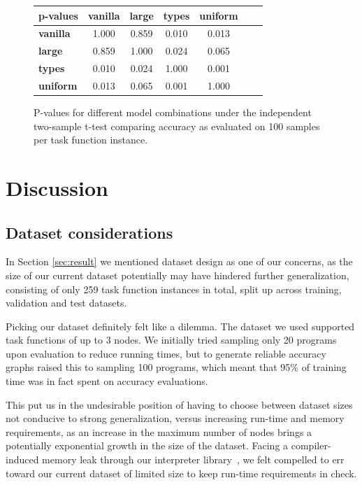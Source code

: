 \documentclass{article}
\begin{document}
\begin{figure}
    \begin{tabular}{|l|c|c|c|c|c|c|} \hline
        \textbf{p-values}
        & \textbf{vanilla} & \textbf{large} & \textbf{types} & \textbf{uniform} \\ \hline
        \textbf{vanilla} & 1.000 & 0.859 & 0.010 & 0.013 \\ \hline
        \textbf{large} & 0.859 & 1.000 & 0.024 & 0.065 \\ \hline
        \textbf{types} & 0.010 & 0.024 & 1.000 & 0.001 \\ \hline
        \textbf{uniform} & 0.013 & 0.065 & 0.001 & 1.000 \\ \hline
    \end{tabular}
    \caption{P-values for different model combinations under the independent two-sample t-test comparing accuracy as evaluated on 100 samples per task function instance.}
    \label{fig:ttest}
\end{figure}

\pagebreak

\section{Discussion} %

\subsection{Dataset considerations}

In Section \ref{sec:result} we mentioned dataset design as one of our concerns,
as the size of our current dataset potentially may have hindered further generalization,
consisting of only 259 task function instances in total,
split up across training, validation and test datasets.

Picking our dataset definitely felt like a dilemma.
The dataset we used supported task functions of up to 3 nodes.
We initially tried sampling only 20 programs upon evaluation to reduce running times,
but to generate reliable accuracy graphs raised this to sampling 100 programs,
which meant that 95\% of training time was in fact spent on accuracy evaluations.

This put us in the undesirable position of having to choose
between dataset sizes not conducive to strong generalization,
versus increasing run-time and memory requirements,
as an increase in the maximum number of nodes brings a potentially exponential growth in the size of the dataset.
Facing a compiler-induced memory leak through our interpreter library~\citep{hintleak},
we felt compelled to err toward our current dataset of
limited size to keep run-time requirements in check.
\end{document}
